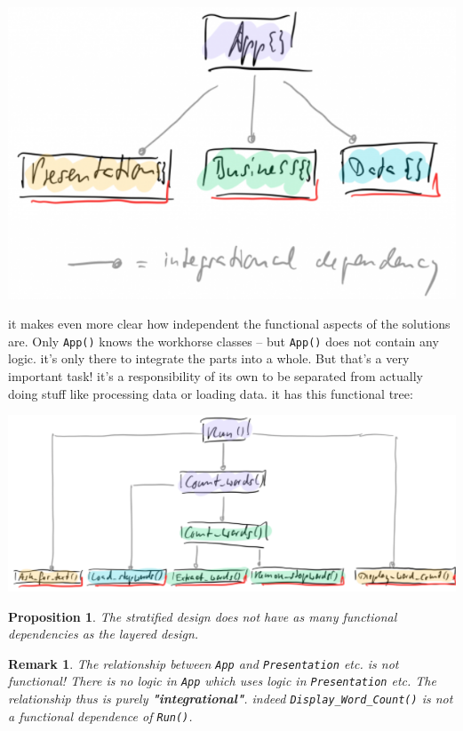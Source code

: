 \documentclass[a4paper,twoside]{article}
\newtheorem{proposition}[theorem]{Proposition}
\newtheorem{remark}[theorem]{Remark}
\numberwithin{equation}{section}
\begin{document}
\begin{center}
    \includegraphics[scale = 0.3]{assets/level_hierarchy.png}
\end{center}
it makes even more clear how independent the functional aspects of the solutions are. Only \texttt{App()} knows the workhorse classes – but \texttt{App()} does not contain any logic. it's only there to integrate the parts into a whole. But that's a very important task! it's a responsibility of its own to be separated from actually doing stuff like processing data or loading data. it has this functional tree:
\begin{center}
    \includegraphics[scale = 0.3]{assets/strata_tree.png}
\end{center}
\begin{proposition}
    The stratified design does not have as many functional dependencies as the layered design.
\end{proposition}
\begin{remark}
    The relationship between \texttt{App} and \texttt{Presentation} etc. is not functional!
    There is no logic in \texttt{App} which uses logic in \texttt{Presentation} etc.
    The relationship thus is purely \textbf{"integrational"}. indeed \texttt{Display\_Word\_Count()}
    is not a functional dependence of \texttt{Run()}.
\end{remark}
\end{document}
